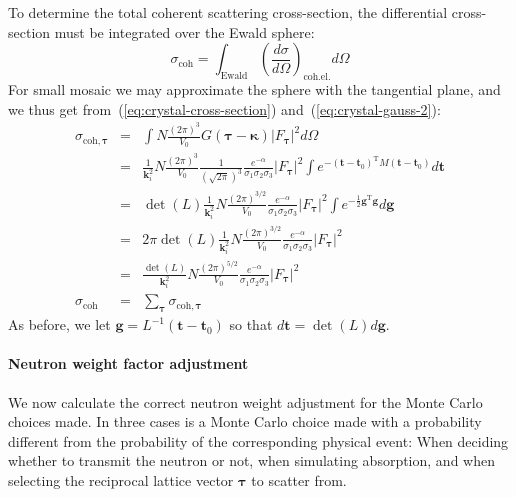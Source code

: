 To determine the total coherent scattering cross-section, the differential
cross-section must be integrated over the Ewald sphere:
$$
\sigma_\textrm{coh} = \int_\textrm{Ewald}
\left(\frac{d\sigma}{d\Omega}\right)_\textrm{coh.el.} d\Omega
$$
For small mosaic we may approximate the sphere with the tangential
plane, and we thus get from~(\ref{eq:crystal-cross-section})
and~(\ref{eq:crystal-gauss-2}):
\begin{eqnarray}
  \label{eq:crystal-coh-cs}
  \sigma_{\textrm{coh},\boldsymbol{\tau}} &=& \int N\frac{(2\pi)^3}{V_0}
        G(\boldsymbol{\tau} - \boldsymbol{\kappa})
         |F_{\boldsymbol{\tau}}|^2 d\Omega \\
  &=& \frac{1}{\boldsymbol{k}_i^2} N\frac{(2\pi)^3}{V_0}
         \frac{1}{(\sqrt{2\pi})^3}\frac{e^{-\alpha}}{\sigma_1\sigma_2\sigma_3}
         |F_{\boldsymbol{\tau}}|^2
         \int e^{-(\boldsymbol{t}-\boldsymbol{t}_0)^\textrm{T} M
         (\boldsymbol{t}-\boldsymbol{t}_0)}
         d\boldsymbol{t} \\
  &=& \det(L) \frac{1}{\boldsymbol{k}_i^2} N\frac{(2\pi)^{3/2}}{V_0}
         \frac{e^{-\alpha}}{\sigma_1\sigma_2\sigma_3}
         |F_{\boldsymbol{\tau}}|^2
         \int e^{-\frac{1}{2}\boldsymbol{g}^\textrm{T}\boldsymbol{g}}
         d\boldsymbol{g} \\
  &=& 2\pi\det(L) \frac{1}{\boldsymbol{k}_i^2} N\frac{(2\pi)^{3/2}}{V_0}
         \frac{e^{-\alpha}}{\sigma_1\sigma_2\sigma_3}
         |F_{\boldsymbol{\tau}}|^2 \\
  &=& \frac{\det(L)}{\boldsymbol{k}_i^2} N\frac{(2\pi)^{5/2}}{V_0}
         \frac{e^{-\alpha}}{\sigma_1\sigma_2\sigma_3}
         |F_{\boldsymbol{\tau}}|^2 \\
  \sigma_\textrm{coh} &=& \sum_{\boldsymbol{\tau}} \sigma_{\textrm{coh},\boldsymbol{\tau}}
\end{eqnarray}
As before, we let $\boldsymbol{g} = L^{-1}(\boldsymbol{t} -
\boldsymbol{t}_0)$ so that $d\boldsymbol{t} = \det(L) d\boldsymbol{g}$.

\paragraph{Neutron weight factor adjustment}

We now calculate the correct neutron weight adjustment for the Monte
Carlo choices made. In three cases is a Monte Carlo choice made with a
probability different from the probability of the corresponding physical
event: When deciding whether to transmit the neutron or not, when
simulating absorption, and when selecting the reciprocal lattice vector
$\boldsymbol{\tau}$ to scatter from.

